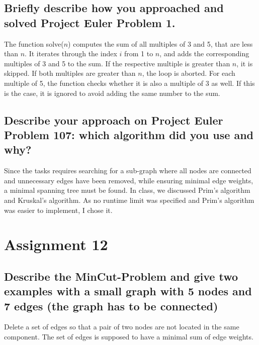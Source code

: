 \documentclass[runningheads]{llncs}
\begin{document}
\subsection*{Briefly describe how you approached and solved Project Euler Problem 1.}
The function solve($n$) computes the sum of all multiples of 3 and 5, that are less than $n$. It iterates through the index $i$ from 1 to $n$, and
adds the corresponding multiples of 3 and 5 to the sum. If the respective multiple is greater than $n$, it is skipped. If both multiples are greater than $n$, the
loop is aborted. For each multiple of 5, the function checks whether it is also a multiple of 3 as well. If this is the case, it is ignored to avoid adding the same number to the sum.

\subsection*{Describe your approach on Project Euler Problem 107: which algorithm did you use and why?}
Since the tasks requires searching for a sub-graph where all nodes are connected and unnecessary edges have been removed, while ensuring minimal edge weights,
a minimal spanning tree must be found. In class, we discussed Prim's algorithm and Kruskal's algorithm. As no runtime limit was specified and Prim's algorithm 
was easier to implement, I chose it.

\section*{Assignment 12}
\subsection*{Describe the MinCut-Problem and give two examples with a small graph with
    5 nodes and 7 edges (the graph has to be connected)}

Delete a set of edges so that a pair of two nodes are not located in the same component. The set of edges is supposed to have a minimal sum of
edge weights.


\begin{thebibliography}{8}

\end{thebibliography}
\end{document}
